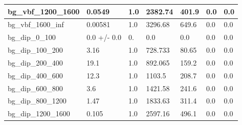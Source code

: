 \documentclass[a4paper, 10pt]{article}
\begin{document}
\begin{table}[H]
\begin{center}
\begin{tabular}{|m{23.0mm}|m{23.0mm}|m{18.0mm}|m{19.0mm}|m{19.0mm}|m{19.0mm}|m{19.0mm}|}
      \hline
      {\cellcolor{white}         bg\_vbf\_1200\_1600}& {\cellcolor{white}         0.0549}& {\cellcolor{white}         1.0}& {\cellcolor{white}         2382.74}& {\cellcolor{white}         401.9}& {\cellcolor{green}         0.0}& {\cellcolor{green}         0.0}\\
      \hline
      {\cellcolor{white}         bg\_vbf\_1600\_inf}& {\cellcolor{white}         0.00581}& {\cellcolor{white}         1.0}& {\cellcolor{white}         3296.68}& {\cellcolor{white}         649.6}& {\cellcolor{green}         0.0}& {\cellcolor{green}         0.0}\\
      \hline
      {\cellcolor{white}         bg\_dip\_0\_100}& {\cellcolor{white}         0.0 +/\-- 0.0}& {\cellcolor{white}         0.}& {\cellcolor{white}         0.0}& {\cellcolor{white}         0.0}& {\cellcolor{green}         0.0}& {\cellcolor{green}         0.0}\\
      \hline
      {\cellcolor{white}         bg\_dip\_100\_200}& {\cellcolor{white}         3.16}& {\cellcolor{white}         1.0}& {\cellcolor{white}         728.733}& {\cellcolor{white}         80.65}& {\cellcolor{green}         0.0}& {\cellcolor{green}         0.0}\\
      \hline
      {\cellcolor{white}         bg\_dip\_200\_400}& {\cellcolor{white}         19.1}& {\cellcolor{white}         1.0}& {\cellcolor{white}         892.065}& {\cellcolor{white}         159.2}& {\cellcolor{green}         0.0}& {\cellcolor{green}         0.0}\\
      \hline
      {\cellcolor{white}         bg\_dip\_400\_600}& {\cellcolor{white}         12.3}& {\cellcolor{white}         1.0}& {\cellcolor{white}         1103.5}& {\cellcolor{white}         208.7}& {\cellcolor{green}         0.0}& {\cellcolor{green}         0.0}\\
      \hline
      {\cellcolor{white}         bg\_dip\_600\_800}& {\cellcolor{white}         3.6}& {\cellcolor{white}         1.0}& {\cellcolor{white}         1421.58}& {\cellcolor{white}         241.6}& {\cellcolor{green}         0.0}& {\cellcolor{green}         0.0}\\
      \hline
      {\cellcolor{white}         bg\_dip\_800\_1200}& {\cellcolor{white}         1.47}& {\cellcolor{white}         1.0}& {\cellcolor{white}         1833.63}& {\cellcolor{white}         311.4}& {\cellcolor{green}         0.0}& {\cellcolor{green}         0.0}\\
      \hline
      {\cellcolor{white}         bg\_dip\_1200\_1600}& {\cellcolor{white}         0.105}& {\cellcolor{white}         1.0}& {\cellcolor{white}         2597.16}& {\cellcolor{white}         496.1}& {\cellcolor{green}         0.0}& {\cellcolor{green}         0.0}\\

\end{tabular}
\end{center}
\end{table}
\end{document}
